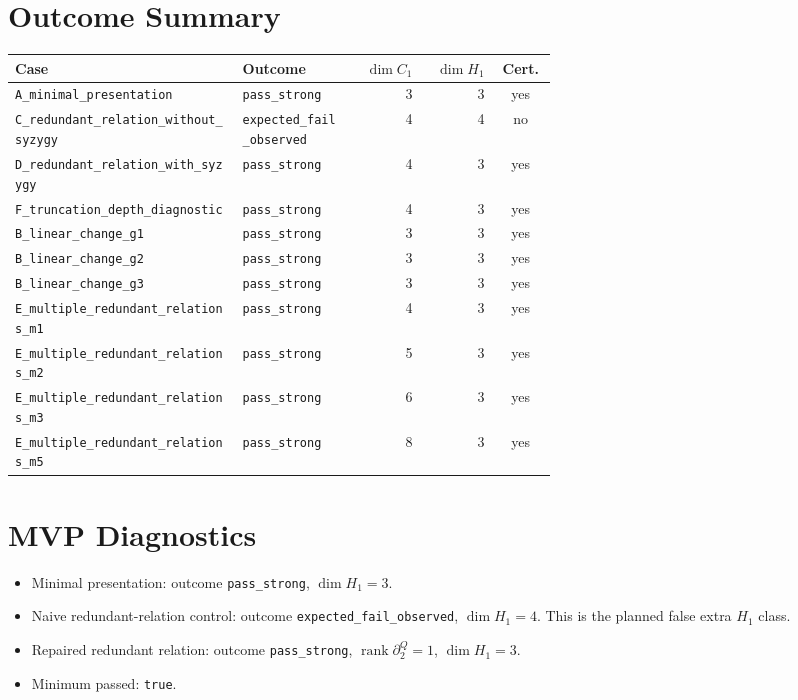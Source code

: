 \documentclass[11pt]{article}
\begin{document}
\section{Outcome Summary}
\begin{center}
\scriptsize
\begin{tabular}{p{0.42\linewidth}p{0.21\linewidth}rrc}
\toprule
Case & Outcome & \(\dim C_1\) & \(\dim H_1\) & Cert. \\
\midrule
\texttt{A\_minimal\_presentation} & \texttt{pass\_strong} & 3 & 3 & yes \\
\texttt{C\_redundant\_relation\_without\_syzygy} & \texttt{expected\_fail\_observed} & 4 & 4 & no \\
\texttt{D\_redundant\_relation\_with\_syzygy} & \texttt{pass\_strong} & 4 & 3 & yes \\
\texttt{F\_truncation\_depth\_diagnostic} & \texttt{pass\_strong} & 4 & 3 & yes \\
\texttt{B\_linear\_change\_g1} & \texttt{pass\_strong} & 3 & 3 & yes \\
\texttt{B\_linear\_change\_g2} & \texttt{pass\_strong} & 3 & 3 & yes \\
\texttt{B\_linear\_change\_g3} & \texttt{pass\_strong} & 3 & 3 & yes \\
\texttt{E\_multiple\_redundant\_relations\_m1} & \texttt{pass\_strong} & 4 & 3 & yes \\
\texttt{E\_multiple\_redundant\_relations\_m2} & \texttt{pass\_strong} & 5 & 3 & yes \\
\texttt{E\_multiple\_redundant\_relations\_m3} & \texttt{pass\_strong} & 6 & 3 & yes \\
\texttt{E\_multiple\_redundant\_relations\_m5} & \texttt{pass\_strong} & 8 & 3 & yes \\
\bottomrule
\end{tabular}
\end{center}

\section{MVP Diagnostics}
\begin{itemize}
\item Minimal presentation: outcome \texttt{pass\_strong}, \(\dim H_1=3\).
\item Naive redundant-relation control: outcome \texttt{expected\_fail\_observed}, \(\dim H_1=4\).  This is the planned false extra $H_1$ class.
\item Repaired redundant relation: outcome \texttt{pass\_strong}, \(\operatorname{rank}\partial_2^Q=1\), \(\dim H_1=3\).
\item Minimum passed: \texttt{true}.
\end{itemize}
\end{document}
